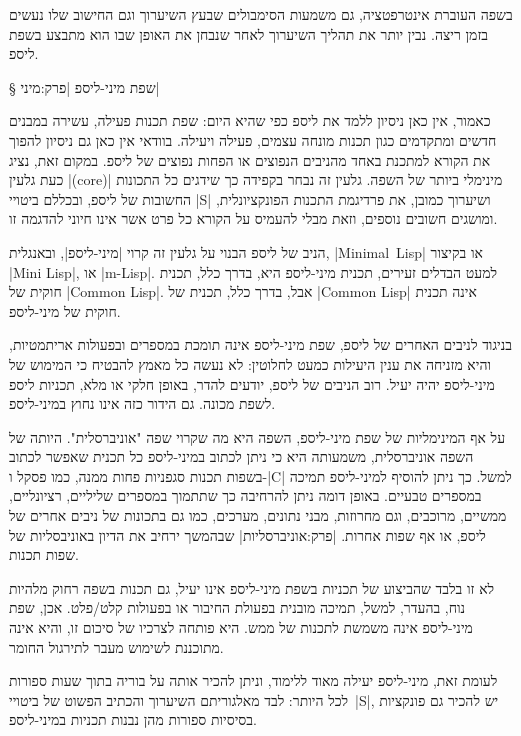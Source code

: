 בשפה העוברת אינטרפטציה, גם משמעות הסימבולים שבעץ השיערוך וגם החישוב שלו נעשים
בזמן ריצה. נבין יותר את תהליך השיערוך לאחר שנבחן את האופן שבו הוא מתבצע בשפת
ליספ.
\begin{LTR}
\scriptsize

\end{LTR}
§ שפת מיני-ליספ
|פרק:מיני|

כאמור, אין כאן ניסיון ללמד את ליספ כפי שהיא היום: שפת תכנות פעילה, עשירה
במבנים חדשים ומתקדמים כגון תכנות מונחה עצמים, פעילה ויעילה. בוודאי אין כאן גם
ניסיון להפוך את הקורא למתכנת באחד מהניבים הנפוצים או הפחות נפוצים של ליספ.
במקום זאת, נציג כעת גלעין \E|(core)| מינימלי ביותר של השפה. גלעין זה נבחר
בקפידה כך שידגים כל התכונות החשובות של ליספ, ובכללם ביטויי \E|S| ושיערוך כמובן,
את פרדיגמת התכנות הפונקציונלית, ומושגים חשובים נוספים, וזאת מבלי להעמיס על
הקורא כל פרט אשר אינו חיוני להדגמה זו.

הניב של ליספ הבנוי על גלעין זה קרוי \ע|מיני-ליספ|, ובאנגלית, \E|Minimal~Lisp|
או בקיצור \E|Mini Lisp|, או \E|m-Lisp|. למעט הבדלים זעירים, תכנית מיני-ליספ
היא, בדרך כלל, תכנית חוקית של \E|Common Lisp|. אבל, בדרך כלל, תכנית של
\E|Common Lisp| אינה תכנית חוקית של מיני-ליספ.

בניגוד לניבים האחרים של ליספ, שפת מיני-ליספ אינה תומכת במספרים ובפעולות
אריתמטיות, והיא מזניחה את ענין היעילות כמעט לחלוטין: לא נעשה כל מאמץ להבטיח כי
המימוש של מיני-ליספ יהיה יעיל. רוב הניבים של ליספ, יודעים להדר, באופן
חלקי או מלא, תכניות ליספ לשפת מכונה. גם הידור כזה אינו נחוץ במיני-ליספ.

על אף המינימליות של שפת מיני-ליספ, השפה היא מה שקרוי שפה "אוניברסלית". היותה של
השפה אוניברסלית, משמעותה היא כי ניתן לכתוב במיני-ליספ כל תכנית שאפשר לכתוב
בשפות תכנות סגפניות פחות ממנה, כמו פסקל ו-\E|C| למשל. כך ניתן להוסיף למיני-ליספ
תמיכה במספרים טבעיים. באופן דומה ניתן להרחיבה כך שתתמוך במספרים שליליים,
רציונליים, ממשיים, מרוכבים, וגם מחרוזות, מבני נתונים, מערכים, כמו גם בתכונות של
ניבים אחרים של ליספ, או אף שפות אחרות. |פרק:אוניברסליות| שבהמשך ירחיב את
הדיון באוניבסליות של שפות תכנות.

לא זו בלבד שהביצוע של תכניות בשפת מיני-ליספ אינו יעיל, גם תכנות בשפה רחוק
מלהיות נוח, בהעדר, למשל, תמיכה מובנית בפעולת החיבור או בפעולות קלט/פלט. אכן,
שפת מיני-ליספ אינה משמשת לתכנות של ממש. היא פותחה לצרכיו של סיכום זו, והיא אינה
מתוכננת לשימוש מעבר לתירגול החומר.

לעומת זאת, מיני-ליספ יעילה מאוד ללימוד, וניתן להכיר אותה על בוריה בתוך שעות
ספורות לכל היותר: לבד מאלגוריתם השיערוך והכתיב הפשוט של ביטויי~\E|S|, יש להכיר
גם פונקציות בסיסיות ספורות מהן נבנות תכניות במיני-ליספ.


